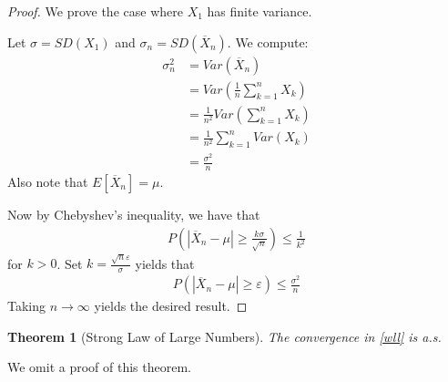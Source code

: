 \documentclass[11pt]{amsart}
\newtheorem{theorem}{Theorem}[section]
\theoremstyle{definition}
\numberwithin{equation}{section}
\begin{document}
\begin{proof}
    We prove the case where $X_1$ has finite variance.
    
    Let $\sigma=SD(X_1)$ and $\sigma_n=SD(\overline{X}_n)$. We compute:
    \begin{align*}
        \sigma_n^2&=Var(\overline{X}_n)\\
        &=Var(\frac{1}{n}\sum_{k=1}^nX_k)\\
        &=\frac{1}{n^2}Var(\sum_{k=1}^nX_k)\\
        &=\frac{1}{n^2}\sum_{k=1}^nVar(X_k)\\
        &=\frac{\sigma^2}{n}
    \end{align*}
    Also note that $E[\overline{X}_n]=\mu$.
    
    Now by Chebyshev's inequality, we have that
    \begin{align*}
        P(|\overline{X}_n-\mu|\ge \frac{k\sigma}{\sqrt{n}})\le\frac{1}{k^2}
    \end{align*}
    for $k>0$. Set $k=\frac{\sqrt{n}\varepsilon}{\sigma}$ yields that
    \begin{align*}
        P(|\overline{X}_n-\mu|\ge \varepsilon)\le\frac{\sigma^2}{n}
    \end{align*}
    Taking $n\to\infty$ yields the desired result.
\end{proof}
\begin{theorem}[Strong Law of Large Numbers]
    The convergence in \ref{wll} is a.s.
\end{theorem}
We omit a proof of this theorem.
\end{document}
